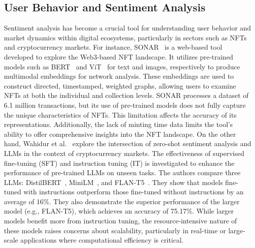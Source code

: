 \documentclass[5p,twocolumn]{elsarticle}
\begin{document}
\subsection{User Behavior and Sentiment Analysis}
Sentiment analysis has become a crucial tool for understanding user behavior and market dynamics within digital ecosystems, particularly in sectors such as NFTs and cryptocurrency markets. For instance, SONAR~\cite{la2023sonar} is a web-based tool developed to explore the Web3-based NFT landscape. It utilizes pre-trained models such as BERT~\cite{devlin2018bert} and ViT~\cite{khan2022transformers} for text and images, respectively to produce multimodal embeddings for network analysis. These embeddings are used to construct directed, timestamped, weighted graphs, allowing users to examine NFTs at both the individual and collection levels. SONAR processes a dataset of 6.1 million transactions, but its use of pre-trained models does not fully capture the unique characteristics of NFTs. This limitation affects the accuracy of its representations. Additionally, the lack of minting time data limits the tool's ability to offer comprehensive insights into the NFT landscape. On the other hand, Wahidur et al.~\cite{wahidur2024enhancing} explore the intersection of zero-shot sentiment analysis and LLMs in the context of cryptocurrency markets. The effectiveness of supervised fine-tuning (SFT) and instruction tuning (IT) is investigated to enhance the performance of pre-trained LLMs on unseen tasks. The authors compare three LLMs: DistilBERT~\cite{sanh2019distilbert}, MiniLM~\cite{wang2020minilm}, and FLAN-T5~\cite{suresh2023semantic}. They show that models fine-tuned with instructions outperform those fine-tuned without instructions by an average of 16\%. They also demonstrate the superior performance of the larger model (e.g., FLAN-T5), which achieves an accuracy of 75.17\%. While larger models benefit more from instruction tuning, the resource-intensive nature of these models raises concerns about scalability, particularly in real-time or large-scale applications where computational efficiency is critical.
\end{document}
